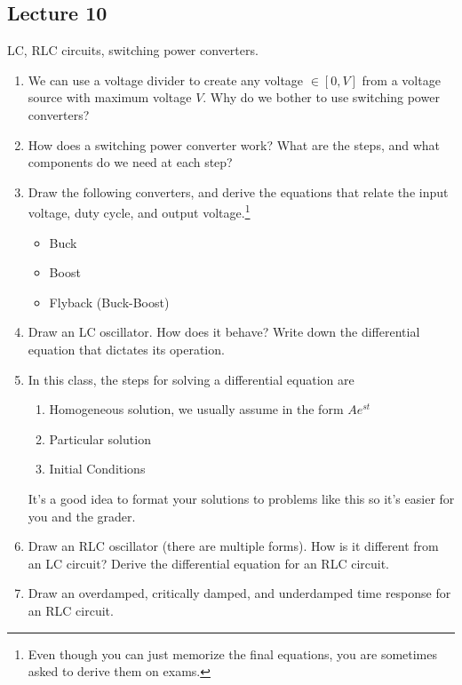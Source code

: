 \subsection*{Lecture 10}
LC, RLC circuits, switching power converters.

\begin{enumerate}
  \item We can use a voltage divider to create any voltage $\in [0, V]$ from
  a voltage source with maximum voltage $V$. Why do we bother to use
  switching power converters?
  \item How does a switching power converter work? What are the steps, and
  what components do we need at each step?
  \item Draw the following converters, and derive the equations that relate
  the input voltage, duty cycle, and output voltage.\footnote{Even though you
  can just memorize the final equations, you are sometimes asked to derive
  them on exams.}
  \begin{itemize}
    \item Buck
    \item Boost
    \item Flyback (Buck-Boost)
  \end{itemize}
  \item Draw an LC oscillator. How does it behave? Write down the
  differential equation that dictates its operation.
  \item In this class, the steps for solving a differential equation are
  \begin{enumerate}[label=\arabic*.]
    \item Homogeneous solution, we usually assume in the form $Ae^{st}$
    \item Particular solution
    \item Initial Conditions
  \end{enumerate}
  It's a good idea to format your solutions to problems like this so it's
  easier for you and the grader.
  \item Draw an RLC oscillator (there are multiple forms). How is it
	different from an LC circuit? Derive the differential equation for an RLC circuit.
	\item Draw an overdamped, critically damped, and underdamped time response for an RLC circuit.
\end{enumerate}


